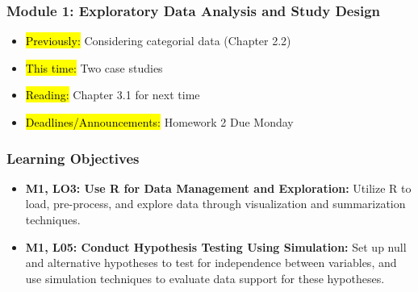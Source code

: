 
\begin{frame}
    \frametitle{Module 1: Exploratory Data Analysis and Study Design}
    \begin{itemize}
        \item \hl{Previously: } Considering categorial data (Chapter 2.2)
        \item \hl{This time: } Two case studies
        \item \hl{Reading: } Chapter 3.1 for next time
        \item \hl{Deadlines/Announcements: }Homework 2 Due Monday
    \end{itemize}
    
\end{frame}

\begin{frame}
    \frametitle{Learning Objectives}
    \begin{itemize}
        \item \textbf{M1, LO3: Use R for Data Management and Exploration:} Utilize R to load, pre-process, and explore data through visualization and summarization techniques.
        \item \textbf{M1, L05: Conduct Hypothesis Testing Using Simulation:} Set up null and alternative hypotheses to test for independence between variables, and use simulation techniques to evaluate data support for these hypotheses.
    \end{itemize}
\end{frame}
